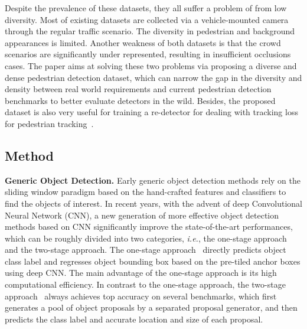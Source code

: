 \documentclass[journal]{IEEEtran}
\def\ie{{\em i.e.}}
\begin{document}
Despite the prevalence of these datasets, they all suffer a problem of from low diversity. Most of existing datasets are collected via a vehicle-mounted camera through the regular traffic scenario. The diversity in pedestrian and background appearances is limited. Another weakness of both datasets is that the crowd scenarios are significantly under represented, resulting in insufficient occlusions cases. The paper aims at solving these two problems via proposing a diverse and dense pedestrian detection dataset, which can narrow the gap in the diversity and density between real world requirements and current pedestrian detection benchmarks to better evaluate detectors in the wild. Besides, the proposed dataset is also very useful for training a re-detector for dealing with tracking loss for pedestrian tracking~\cite{DBLP:journals/tip/SundaresanC09, DBLP:journals/tip/LanZYC18}.

\subsection{Method}
{\flushleft \textbf{Generic Object Detection.}}
Early generic object detection methods rely on the sliding window paradigm based on the hand-crafted features and classifiers to find the objects of interest. In recent years, with the advent of deep Convolutional Neural Network (CNN), a new generation of more effective object detection methods based on CNN significantly improve the state-of-the-art performances, which can be roughly divided into two categories, \ie, the one-stage approach and the two-stage approach. The one-stage approach~\cite{DBLP:conf/eccv/LiuAESRFB16,DBLP:conf/cvpr/ZhangSF18} directly predicts object class label and regresses object bounding box based on the pre-tiled anchor boxes using deep CNN. The main advantage of the one-stage approach is its high computational efficiency. In contrast to the one-stage approach, the two-stage approach~\cite{DBLP:journals/pami/RenHG017, DBLP:journals/tmm/LiWLDXFY17} always achieves top accuracy on several benchmarks, which first generates a pool of object proposals by a separated proposal generator, and then predicts the class label and accurate location and size of each proposal.
\end{document}
